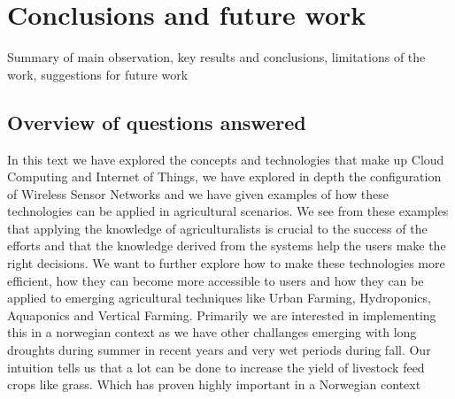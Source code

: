 \documentclass[]{uiophd}
\begin{document}
\chapter{Conclusions and future work}

Summary of main observation, key results and conclusions, limitations of the work, suggestions for future work

\section{Overview of questions answered}
In this text we have explored the concepts and technologies that make up Cloud Computing and Internet of Things, we have explored in depth the configuration of Wireless Sensor Networks and we have given examples of how these technologies can be applied in agricultural scenarios. We see from these examples that applying the knowledge of agriculturalists is crucial to the success of the efforts and that the knowledge derived from the systems help the users make the right decisions. We want to further explore how to make these technologies more efficient, how they can become more accessible to users and how they can be applied to emerging agricultural techniques like Urban Farming, Hydroponics, Aquaponics and Vertical Farming. Primarily we are interested in implementing this in a norwegian context as we have other challanges emerging with long droughts during summer in recent years and very wet periods during fall. Our intuition tells us that a lot can be done to increase the yield of livestock feed crops like grass. Which has proven highly important in a Norwegian context
\end{document}
